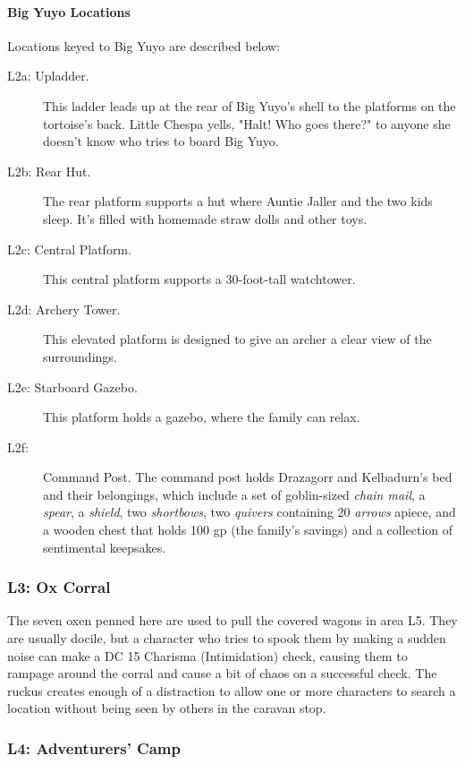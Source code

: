 \documentclass[a4paper, 11pt, bg=full, twocolumn, nooutline]{dndbook}
\begin{document}
\paragraph{Big Yuyo Locations}

Locations keyed to Big Yuyo are described below:

\begin{description}
\item[L2a: Upladder.] This ladder leads up at the rear of Big Yuyo's shell to the platforms on the tortoise's back. Little Chespa yells, "Halt! Who goes there?" to anyone she doesn't know who tries to board Big Yuyo.
\item[L2b: Rear Hut.] The rear platform supports a hut where Auntie Jaller and the two kids sleep. It's filled with homemade straw dolls and other toys.
\item[L2c: Central Platform.] This central platform supports a 30-foot-tall watchtower.
\item[L2d: Archery Tower.] This elevated platform is designed to give an archer a clear view of the surroundings.
\item[L2e: Starboard Gazebo.] This platform holds a gazebo, where the family can relax.
\item[L2f:] Command Post. The command post holds Drazagorr and Kelbadurn's bed and their belongings, which include a set of goblin-sized \textit{chain mail}, a \textit{spear}, a \textit{shield}, two \textit{shortbows}, two \textit{quivers} containing 20 \textit{arrows} apiece, and a wooden chest that holds 100 gp (the family's savings) and a collection of sentimental keepsakes.
\end{description}

\subsubsection{L3: Ox Corral}

The seven oxen penned here are used to pull the covered wagons in area L5. They are usually docile, but a character who tries to spook them by making a sudden noise can make a DC 15 Charisma (Intimidation) check, causing them to rampage around the corral and cause a bit of chaos on a successful check. The ruckus creates enough of a distraction to allow one or more characters to search a location without being seen by others in the caravan stop.

\subsubsection{L4: Adventurers' Camp}
\end{document}

